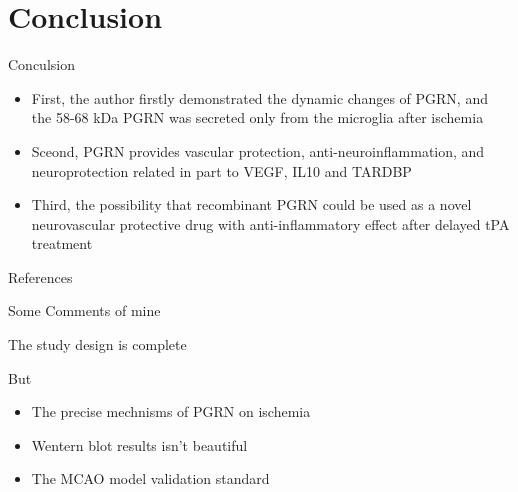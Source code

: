 \documentclass[bigger]{beamer}
\begin{document}
\section{Conclusion}
\label{sec:orgheadline31}
\begin{frame}[label={sec:orgheadline25}]{Conculsion}
\begin{itemize}
\item First, the author firstly demonstrated the dynamic changes of PGRN, and the 58-68 kDa PGRN was secreted only from the microglia after ischemia
\end{itemize}
\vskip 0.5cm
\begin{itemize}
\item Sceond, PGRN provides vascular protection, anti-neuroinflammation, and neuroprotection related in part to VEGF, IL10 and TARDBP
\end{itemize}
\vskip 0.5cm
\begin{itemize}
\item Third, the possibility that recombinant PGRN could be used as a novel neurovascular protective drug with anti-inflammatory effect after delayed tPA treatment
\end{itemize}
\end{frame}
\begin{frame}[label={sec:orgheadline26}]{References}
\tiny
\cite{moretti2015neuroprotection} \cite{george2015novel} \cite{butcher2010acute} \cite{hacke2008thrombolysis} \cite{kanazawa2011biochemical} \cite{kanazawa2011inhibition} \cite{nguyen2013progranulin} \cite{o20061}
\printbibliography[heading = none]
\end{frame}
\begin{frame}[label={sec:orgheadline27}]{Some Comments of mine}
\begin{block}{The study design is complete}
\end{block}
\begin{block}{\pause But}
\begin{itemize}
\item The precise mechnisms of PGRN on ischemia
\item \pause Wentern blot results isn't beautiful
\item \pause The MCAO model validation standard
\end{itemize}
\end{block}
\end{frame}
\end{document}
